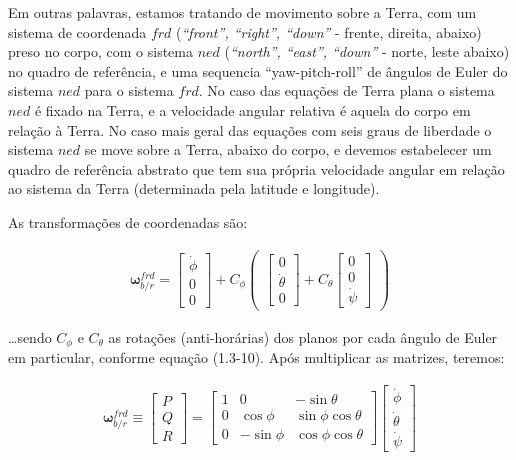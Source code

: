 Em outras palavras, estamos tratando de movimento sobre a Terra, com um sistema de coordenada \(frd\) (\emph{``front'', ``right'', ``down''} - frente, direita, abaixo) preso no corpo, com o sistema \(ned\) (\emph{``north'', ``east'', ``down''} - norte, leste abaixo) no quadro de referência, e uma sequencia ``yaw-pitch-roll'' de ângulos de Euler do sistema \(ned\) para o sistema \(frd\). No caso das equações de Terra plana o sistema \(ned\) é fixado na Terra, e a velocidade angular relativa é aquela do corpo em relação à Terra. No caso mais geral das equações com seis graus de liberdade o sistema \(ned\) se move sobre a Terra, abaixo do corpo, e devemos estabelecer um quadro de referência abstrato que tem sua própria velocidade angular em relação ao sistema da Terra (determinada pela latitude e longitude).

As transformações de coordenadas são:

\begin{align*}
    \mathbf{\omega}^{frd}_{b/r} = \begin{bmatrix} \dot\phi \\ 0 \\0 \end{bmatrix}
    + C_{\phi} \begin{pmatrix}
        \begin{bmatrix} 0 \\ \dot\theta \\ 0 \end{bmatrix}
        + C_{\theta}\begin{bmatrix} 0 \\ 0 \\ \dot\psi \end{bmatrix}
    \end{pmatrix}
\end{align*}

\ldots sendo \(C_{\phi}\) e \(C_{\theta}\)  as rotações (anti-horárias) dos
planos por cada ângulo de Euler em particular, conforme equação (1.3-10). Após
multiplicar as matrizes, teremos:

\begin{align} \tag{1.4-3}
    \mathbf{\omega}^{frd}_{b/r} \equiv \begin{bmatrix} P \\ Q \\ R \end{bmatrix}
    = \begin{bmatrix}
        1 & 0 & -\sin{\theta} \\
        0 & \cos{\phi} & \sin{\phi}\cos{\theta} \\
        0 & -\sin{\phi} & \cos{\phi}\cos{\theta}
    \end{bmatrix}
    \begin{bmatrix}
        \dot\phi \\
        \dot\theta \\
        \dot\psi
    \end{bmatrix}
\end{align}

